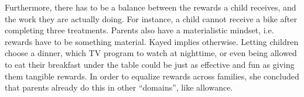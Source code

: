 Furthermore, there has to be a balance between the rewards a child receives, and the work they are actually doing. For instance, a child cannot receive a bike after completing three treatments. Parents also have a materialistic mindset, i.e. rewards have to be something material. Kayed implies otherwise. Letting children choose a dinner, which TV program to watch at nighttime, or even being allowed to eat their breakfast under the table could be just as effective and fun as giving them tangible rewards. In order to equalize rewards across families, she concluded that parents already do this in other ``domains'', like allowance.   



